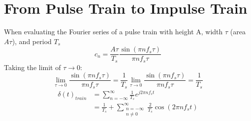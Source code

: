 \documentclass[oneside]{book}
\begin{document}
            \begin{minipage}{0.45\linewidth}
                \centering
            \end{minipage}
        \section{From Pulse Train to Impulse Train}
            When evaluating the Fourier series of a pulse train with height A, width $\tau$ (area $A\tau$), and period $T_s$
            \begin{equation*}
                c_n = \frac{A\tau}{T_s} \frac{\sin(\pi nf_s \tau)}{\pi n f_s \tau}
            \end{equation*}
            Taking the limit of $\tau \rightarrow 0$:
            \begin{equation*}
                \lim_{\tau \rightarrow 0} \frac{\sin(\pi nf_s \tau)}{\pi n f_s \tau} = \frac{1}{T_s} \lim_{\tau \rightarrow 0} \frac{\sin(\pi nf_s \tau)}{\pi n f_s \tau} = \frac{1}{T_s}
            \end{equation*}
            \begin{align*}
                \delta(t)_{train} &= \sum^{\infty}_{n=-\infty} \frac{1}{T_s} e^{j2\pi nf_s t}\\
                &= \frac{1}{T_s} + \sum_{\substack{n=-\infty\\ n\neq 0}}^{\infty} \frac{2}{T_s}\cos\left(2\pi n f_s t\right)
            \end{align*}
\end{document}
